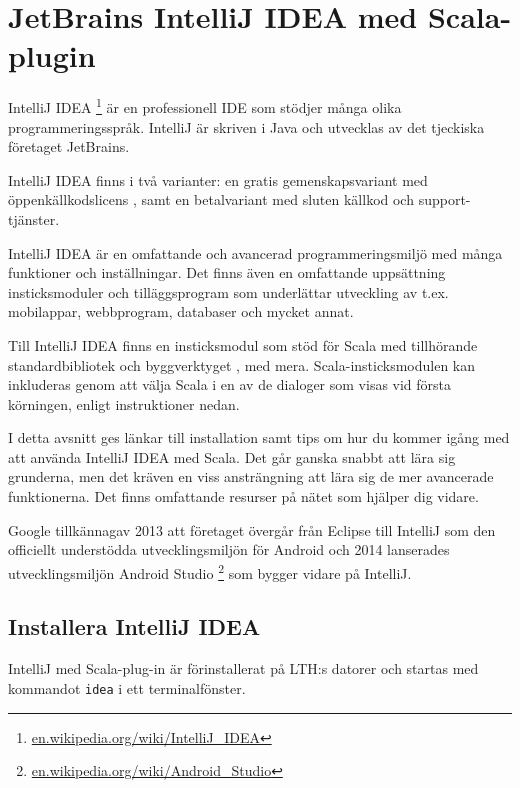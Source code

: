 
\section{JetBrains IntelliJ IDEA med Scala-plugin}\label{appendix:ide:intellij}

IntelliJ IDEA%
\footnote{\href{https://en.wikipedia.org/wiki/IntelliJ_IDEA}{en.wikipedia.org/wiki/IntelliJ\_IDEA}}
 är en professionell IDE som stödjer många olika programmeringsspråk. IntelliJ är skriven i Java och utvecklas av det tjeckiska företaget JetBrains.

IntelliJ IDEA finns i två varianter: en gratis gemenskapsvariant med öppenkällkodslicens , samt en betalvariant med sluten källkod och support-tjänster.


IntelliJ IDEA är en omfattande och avancerad programmeringsmiljö med många funktioner och inställningar. Det finns även en omfattande uppsättning insticksmoduler och tilläggsprogram som underlättar utveckling av t.ex. mobilappar, webbprogram, databaser och mycket annat.

Till IntelliJ IDEA finns en insticksmodul  som stöd för Scala med tillhörande standardbibliotek och byggverktyget , med mera. Scala-insticksmodulen kan inkluderas genom att välja Scala i en av de dialoger som visas vid första körningen, enligt instruktioner nedan.

I detta avsnitt ges länkar till installation samt tips om hur du kommer igång med att använda IntelliJ IDEA med Scala. Det går ganska snabbt att lära sig grunderna, men det kräven en viss ansträngning att lära sig de mer avancerade funktionerna. Det finns omfattande resurser på nätet som hjälper dig vidare.

Google tillkännagav 2013 att företaget övergår från Eclipse till IntelliJ som den officiellt understödda utvecklingsmiljön för Android och 2014 lanserades utvecklingsmiljön Android Studio%
\footnote {\href{https://en.wikipedia.org/wiki/Android_Studio}{en.wikipedia.org/wiki/Android\_Studio}}
 som bygger vidare på IntelliJ.

\subsection{Installera IntelliJ IDEA}\label{appendix:ide:intellij:install}

IntelliJ med Scala-plug-in är förinstallerat på LTH:s datorer och startas med kommandot \texttt{idea} i ett terminalfönster.


